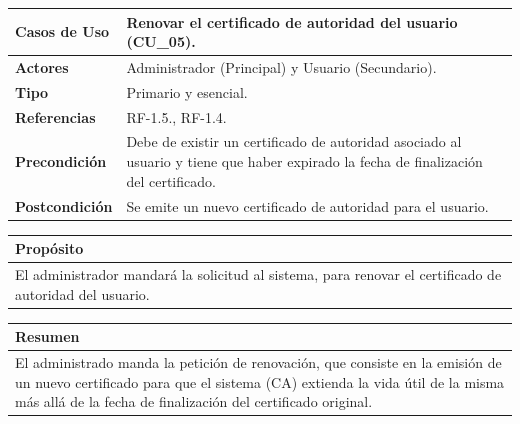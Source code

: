 \begin{itemize}
    \begin{table}[h!]
        \centering
        \begin{tabular}{|l|p{}|}
            \hline
            \textbf{Casos de Uso}   &   Renovar el certificado de autoridad del usuario (CU\_05). \\
            \hline 
            \textbf{Actores}        &   Administrador (Principal) y Usuario (Secundario). \\ 
            \hline 
            \textbf{Tipo}           &   Primario y esencial. \\ 
            \hline
            \textbf{Referencias}    &   RF-1.5., RF-1.4.\\ 
            \hline
            \textbf{Precondición}   &  Debe de existir un certificado de autoridad asociado al usuario y tiene que 
            haber expirado la fecha de finalización del certificado. \\ 
            \hline
            \textbf{Postcondición}  &  Se emite un nuevo certificado de autoridad para el usuario. \\ 
            \hline
        \end{tabular}
        
        \vspace{5mm}
        
        \begin{tabular}{|p{\textwidth}|}
            \hline
            \rowcolor{SeaGreen} \textbf{Propósito} \\
            \hline
            \multicolumn{1}{|p{12cm}|}{El administrador mandará la solicitud al sistema, para renovar el 
            certificado de autoridad del usuario.} \\ [0.5ex]
            \hline
        \end{tabular}
        
        \vspace{5mm}
        
        \begin{tabular}{|p{\textwidth}|}
            \hline
            \rowcolor{SeaGreen} \textbf{Resumen} \\
            \hline
            \multicolumn{1}{|p{12cm}|}{El administrado manda la petición de renovación, que consiste en la emisión de un nuevo 
            certificado para que el sistema (CA) extienda la vida útil de la misma más allá de la fecha de finalización del certificado
            original.} \\ [0.5ex]
            \hline
        \end{tabular}
        

\end{table}
\end{itemize}
